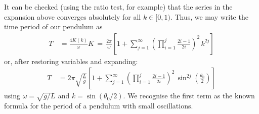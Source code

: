 \documentclass{tjwNOTES}
\begin{document}
It can be checked (using the ratio test, for example) that the series in the expansion above converges absolutely for all $k\in[0,1)$. Thus, we may write the time period of our pendulum as
\begin{align*}
	T &\,= \frac{4K(k)}{\omega}K \,=\, \frac{2\pi}{\omega}\left[1+\sum_{j=1}^{\infty}\left(\prod_{i=1}^{j}\frac{2i-1}{2i}\right)^{2}\,k^{2j} \right]
\end{align*}
or, after restoring variables and expanding:
\begin{align*}
	T &\,= 2\pi\sqrt{\frac{L}{g}}\left[1 + \sum_{j=1}^{\infty}\left(\prod_{i=1}^{j}\frac{2i-1}{2i}\right)^{\!2}\,\sin^{2j}\left(\frac{\theta_{0}}{2}\right)\right]
\end{align*}
using $\omega=\sqrt{g/L}$ and $k=\sin(\theta_{0}/2)$. We recognise the first term as the known formula for the period of a pendulum with small oscillations. 




\end{document}
